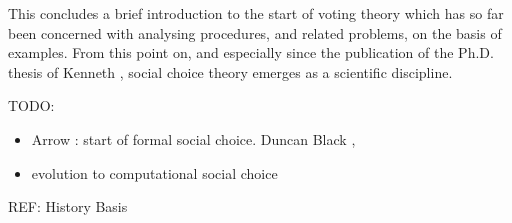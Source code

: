 This concludes a brief introduction to the start of voting theory which has so far been concerned with analysing procedures, and related problems, on the basis of examples. From this point on, and especially since the publication of the Ph.D. thesis of Kenneth \citet{Arrow1951}, social choice theory emerges as a scientific discipline.








TODO:
\begin{itemize}
	\item Arrow \cite{Arrow1951}: start of formal social choice. Duncan Black \cite{Black1958}, \citet{Arrow2002,Arrow2011}
	\item evolution to computational social choice \cite{Comsoc2016}
\end{itemize}

REF:
History \citet{McLeanUrken1995,McLean1990,Urken2004} 
Basis \citet{Gaertner2006, Taylor2005, Nitzan2009}




